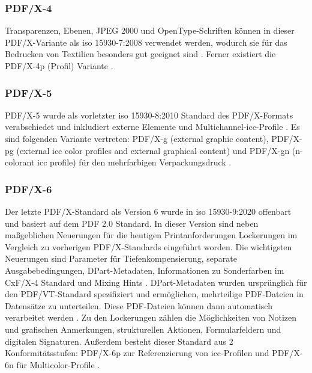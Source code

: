 \subsubsection{PDF/X-4}
Transparenzen, Ebenen, JPEG 2000 und OpenType-Schriften können in dieser PDF/X-Variante als \gls{iso} 15930-7:2008 \cite{proj-consult, schneeberger} verwendet werden, wodurch sie für das Bedrucken von Textilien besonders gut geeignet sind \cite{adobe-pdf-x}. Ferner existiert die PDF/X-4p (Profil) Variante \cite{schneeberger}. 

\subsubsection{PDF/X-5}
PDF/X-5 wurde als vorletzter \gls{iso} 15930-8:2010 Standard des PDF/X-Formats verabschiedet und inkludiert externe Elemente und Multichannel-\gls{icc}-Profile \cite{proj-consult}. Es sind folgenden Variante vertreten: PDF/X-g (external graphic content), PDF/X-pg (external \gls{icc} color profiles and external graphical content) und PDF/X-gn (n-colorant \gls{icc} profile) für den mehrfarbigen Verpackungsdruck \cite{schneeberger}.

\subsubsection{PDF/X-6}
Der letzte PDF/X-Standard als Version 6 wurde in \gls{iso} 15930-9:2020 offenbart und basiert auf dem PDF 2.0 Standard. In dieser Version sind neben maßgeblichen Neuerungen für die heutigen Printanforderungen Lockerungen im Vergleich zu vorherigen PDF/X-Standards eingeführt worden. Die wichtigsten Neuerungen sind Parameter für Tiefenkompensierung, separate Ausgabebedingungen, DPart-Metadaten, Informationen zu Sonderfarben im CxF/X-4 Standard und Mixing Hints \cite{proj-consult}. DPart-Metadaten wurden ursprünglich für den PDF/VT-Standard spezifiziert und ermöglichen, mehrteilige PDF-Dateien in Datensätze zu unterteilen. Diese PDF-Dateien können dann automatisch verarbeitet werden \cite{pdfa-dpart}. Zu den Lockerungen zählen die Möglichkeiten von Notizen und grafischen Anmerkungen, strukturellen Aktionen, Formularfeldern und digitalen Signaturen. Außerdem besteht dieser Standard aus 2 Konformitätsstufen: PDF/X-6p zur Referenzierung von \gls{icc}-Profilen und PDF/X-6n für Multicolor-Profile \cite{proj-consult}. 

